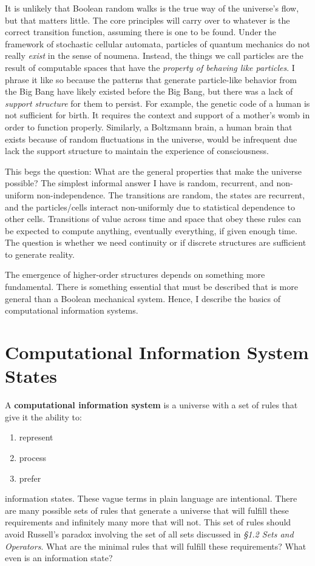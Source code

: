 \documentclass[10pt, a5paper, twoside, openright]{memoir}
\begin{document}
It is unlikely that Boolean random walks is the true way of the universe's flow, but that matters little. The core principles will carry over to whatever is the correct transition function, assuming there is one to be found. Under the framework of stochastic cellular automata, particles of quantum mechanics do not really \textit{exist} in the sense of noumena. Instead, the things we call particles are the result of computable spaces that have the \textit{property of behaving like particles}. I phrase it like so because the patterns that generate particle-like behavior from the Big Bang have likely existed before the Big Bang, but there was a lack of \textit{support structure} for them to persist. For example, the genetic code of a human is not sufficient for birth. It requires the context and support of a mother's womb in order to function properly. Similarly, a Boltzmann brain, a human brain that exists because of random fluctuations in the universe, would be infrequent due lack the support structure to maintain the experience of consciousness.

This begs the question: What are the general properties that make the universe possible? The simplest informal answer I have is random, recurrent, and non-uniform non-independence. The transitions are random, the states are recurrent, and the particles/cells interact non-uniformly due to statistical dependence to other cells. Transitions of value across time and space that obey these rules can be expected to compute anything, eventually everything, if given enough time. The question is whether we need continuity or if discrete structures are sufficient to generate reality.

The emergence of higher-order structures depends on something more fundamental. There is something essential that must be described that is more general than a Boolean mechanical system. Hence, I describe the basics of computational information systems.

\section{Computational Information System States}
A \textbf{computational information system} is a universe with a set of rules that give it the ability to:
\begin{enumerate}
\item represent
\item process
\item prefer
\end{enumerate}
information states. These vague terms in plain language are intentional. There are many possible sets of rules that generate a universe that will fulfill these requirements and infinitely many more that will not. This set of rules should avoid Russell's paradox involving the set of all sets discussed in \textit{\S 1.2 Sets and Operators}. What are the minimal rules that will fulfill these requirements? What even is an information state?
\end{document}
